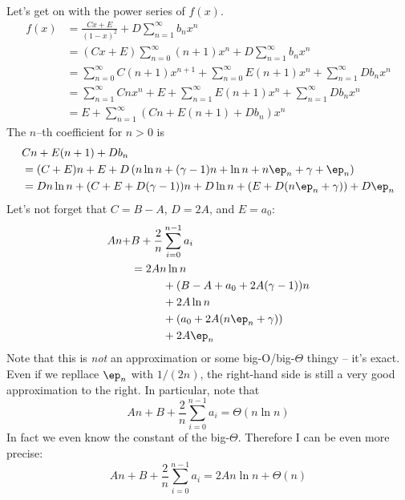 Let's get on with the power series of $f(x)$.
\begin{align*}
f(x)
&= \frac{Cx + E}{(1-x)^2}
  + D \sum_{n=1}^\infty b_n x^n
  \\
&=
  (Cx + E)\sum_{n=0}^\infty (n + 1)x^n
  + D \sum_{n=1}^\infty b_n x^n
  \\
&=
  \sum_{n=0}^\infty C(n + 1)x^{n+1}
  + \sum_{n=0}^\infty E(n + 1)x^n
  + \sum_{n=1}^\infty Db_n x^n
  \\
&=
  \sum_{n=1}^\infty Cn x^n
  + E + \sum_{n=1}^\infty E(n + 1)x^n
  + \sum_{n=1}^\infty Db_n x^n
  \\
&= E + \sum_{n=1}^\infty \left( Cn + E(n+1) + D b_n \right) x^n
\end{align*}
The $n$--th coefficient for $n > 0$ is
\begin{align*}
&Cn + E(n+1) + Db_n
\\
&= (C + E)n
   + E
   + D
   \left(
     n \ln n + (\gamma - 1) n + \ln n + n \ep_n + \gamma + \ep_n
   \right)
   \\   
&= D n \ln n + (C + E + D(\gamma - 1)) n + D\ln n + \left(E + D(n \ep_n + \gamma)\right) + D\ep_n
\end{align*}
Let's not forget that $C = B - A$, $D = 2A$, and $E = a_0$:
\begin{align*}
An + &B + \frac{2}{n} \sum_{i=0}^{n-1} a_i \\
&= 2A n \ln n \\
&\hspace{1cm} + (B - A + a_0 + 2A(\gamma - 1)) n \\
&\hspace{1cm} + 2A\ln n \\
&\hspace{1cm} + \left(a_0 + 2A(n \ep_n + \gamma)\right) \\
&\hspace{1cm} + 2A\ep_n
\end{align*}
Note that this is \textit{not} an approximation or some
big-O/big-$\Theta$ thingy -- it's exact.
Even if we repllace $\ep_n$ with $1/(2n)$,
the right-hand side is still a very good approximation to the right.
In particular, note that 
\[
An + B + \frac{2}{n} \sum_{i=0}^{n-1} a_i = \Theta(n \ln n)
\]
In fact we even know the constant of the big-$\Theta$.
Therefore I can be even more precise:
\[
An + B + \frac{2}{n} \sum_{i=0}^{n-1} a_i =
2A n \ln n + \Theta(n)
\]


